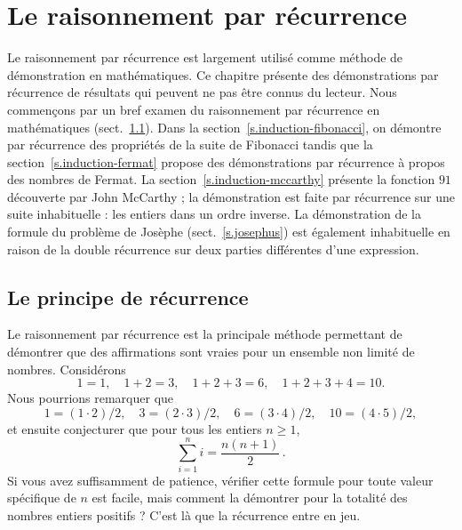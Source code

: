 
\chapter{Le raisonnement par récurrence}\label{c.induction}




Le raisonnement par  récurrence est largement utilisé comme méthode de démonstration en mathématiques. Ce chapitre présente des démonstrations par récurrence de résultats qui peuvent ne pas être connus du lecteur. Nous commençons par un bref examen du raisonnement par récurrence en mathématiques (sect.~\ref{s.induction-axiom}). Dans la section~\ref{s.induction-fibonacci}, on démontre par récurrence des propriétés de la suite de Fibonacci tandis que la section~\ref{s.induction-fermat} propose des démonstrations par récurrence à propos des nombres de Fermat. La section~\ref{s.induction-mccarthy} présente la fonction $91$ découverte par John McCarthy ; la démonstration est faite par récurrence sur une suite inhabituelle : les entiers dans un ordre inverse. La démonstration de la formule du problème de Josèphe (sect.~\ref{s.josephus}) est également inhabituelle en raison de la double récurrence sur deux parties différentes d'une expression.


\section{Le principe  de récurrence }\label{s.induction-axiom}

Le raisonnement par  récurrence est la principale méthode permettant de démontrer que des affirmations sont vraies pour un ensemble non limité de nombres. Considérons 
\[
1=1,\quad 1+2=3,\quad 1+2+3=6,\quad 1+2+3+4=10.
\]
Nous pourrions remarquer que 
\[
1=(1\cdot 2)/2,\quad 3=(2\cdot 3)/2,\quad  6=(3\cdot 4)/2,\quad 10=(4\cdot 5)/2,
\]
et ensuite conjecturer que pour tous les entiers $n\geq 1$,
\[
\sum_{i=1}^n i = \frac{n(n+1)}{2}\,.
\]
Si vous avez suffisamment de patience, vérifier cette formule pour toute valeur spécifique de $n$ est facile, mais comment la démontrer pour la totalité des nombres entiers positifs ? C'est là que la récurrence entre en jeu.

